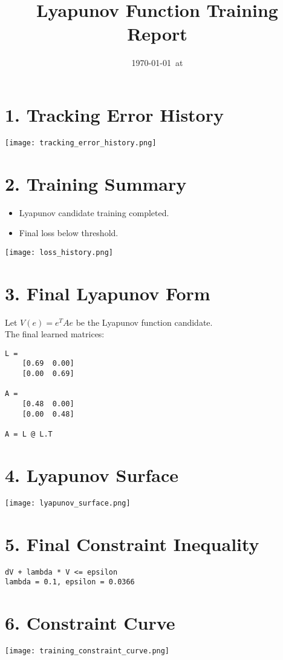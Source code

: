 \documentclass[11pt]{article}
\title{Lyapunov Function Training Report}
\author{}
\date{\today\ at \currenttime}
\begin{document}
\maketitle

\section*{1. Tracking Error History}
\texttt{[image: tracking\_error\_history.png]}

\section*{2. Training Summary}
\begin{itemize}
  \item Lyapunov candidate training completed.
  \item Final loss below threshold.
\end{itemize}
\texttt{[image: loss\_history.png]}

\section*{3. Final Lyapunov Form}
Let $V(e) = e^T A e$ be the Lyapunov function candidate. \\
The final learned matrices:
\begin{verbatim}
L = 
    [0.69  0.00]
    [0.00  0.69]

A = 
    [0.48  0.00]
    [0.00  0.48]

A = L @ L.T
\end{verbatim}

\section*{4. Lyapunov Surface}
\texttt{[image: lyapunov\_surface.png]}

\section*{5. Final Constraint Inequality}
\begin{verbatim}
dV + lambda * V <= epsilon
lambda = 0.1, epsilon = 0.0366\end{verbatim}

\section*{6. Constraint Curve}
\texttt{[image: training\_constraint\_curve.png]}
\end{document}

